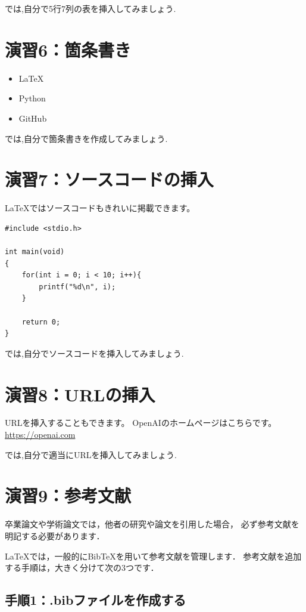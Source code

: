 \documentclass[a4paper,twocolumn]{jsarticle}
\begin{document}
では,自分で5行7列の表を挿入してみましょう.

\section*{演習6：箇条書き}

\begin{itemize}
    \item LaTeX
    \item Python
    \item GitHub
\end{itemize}

では,自分で箇条書きを作成してみましょう.

\section*{演習7：ソースコードの挿入}

LaTeXではソースコードもきれいに掲載できます。

\begin{lstlisting}
#include <stdio.h>

int main(void)
{
    for(int i = 0; i < 10; i++){
        printf("%d\n", i);
    }

    return 0;
}
\end{lstlisting}

では,自分でソースコードを挿入してみましょう.

\section*{演習8：URLの挿入}

URLを挿入することもできます。
OpenAIのホームページはこちらです。\\
\url{https://openai.com}

では,自分で適当にURLを挿入してみましょう.

\section*{演習9：参考文献}

卒業論文や学術論文では，他者の研究や論文を引用した場合，
必ず参考文献を明記する必要があります．

LaTeXでは，一般的にBibTeXを用いて参考文献を管理します．
参考文献を追加する手順は，大きく分けて次の3つです．

\subsection*{手順1：.bibファイルを作成する}
\end{document}
